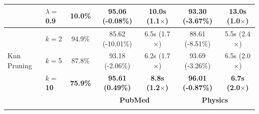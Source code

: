 \documentclass[pdflatex,sn-mathphys-num]{sn-jnl}%
\theoremstyle{thmstyleone}%
\theoremstyle{thmstyletwo}%
\theoremstyle{thmstylethree}%
\theoremstyle{plain} %
\theoremstyle{definition} %
\theoremstyle{remark} %
\theoremstyle{plain} %
\begin{document}
\begin{table}[ht]
\begin{tabular}{llccccc}
 & $\lambda=$0.9 & 10.0\% & 95.06 (-0.08\%) & 10.0s (1.1$\times$) & 93.30 (-3.67\%) & 13.0s (1.0$\times$) \\
\midrule
\multirow{3}{*}{Knn Pruning} 
 & $k=$2 & 94.9\% & 85.62 (-10.01\%) & 6.5s (1.7$\times$) & 88.61 (-8.51\%) & 5.5s (2.4$\times$) \\
 & $k=$5 & 87.8\% & 93.18 (-2.06\%) & 6.2s (1.7$\times$) & 93.69 (-3.26\%) & 6.5s (2.0$\times$) \\
 & \textbf{$k=$10} & \textbf{75.9\%} & \textbf{95.61 (0.49\%)} & \textbf{8.8s (1.2$\times$)} & \textbf{96.01 (-0.87\%)} & \textbf{6.7s (2.0$\times$)} \\
\bottomrule


\multirow{2}{*}{\textbf{}} & \multirow{2}{*}{\textbf{}} & \multirow{2}{*}{\textbf{}} & \multicolumn{2}{c}{\textbf{PubMed}} & \multicolumn{2}{c}{\textbf{Physics}} \\
\cmidrule(lr){4-5} \cmidrule(lr){6-7} 



\end{tabular}
\end{table}
\end{document}
